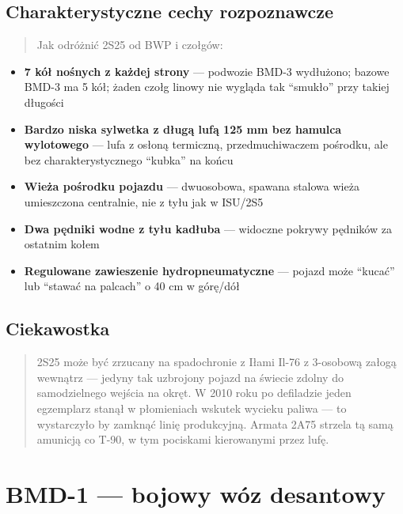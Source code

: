 \documentclass[12pt,oneside]{book}
\providecommand{\tightlist}{%
  \setlength{\itemsep}{0pt}\setlength{\parskip}{0pt}}
\begin{document}
\subsection{Charakterystyczne cechy
rozpoznawcze}\label{charakterystyczne-cechy-rozpoznawcze-6}

\begin{quote}
Jak odróżnić 2S25 od BWP i czołgów:
\end{quote}

\begin{itemize}
\tightlist
\item
  \textbf{7 kół nośnych z każdej strony} --- podwozie BMD-3 wydłużono;
  bazowe BMD-3 ma 5 kół; żaden czołg linowy nie wygląda tak ``smukło''
  przy takiej długości
\item
  \textbf{Bardzo niska sylwetka z długą lufą 125 mm bez hamulca
  wylotowego} --- lufa z osłoną termiczną, przedmuchiwaczem pośrodku,
  ale bez charakterystycznego ``kubka'' na końcu
\item
  \textbf{Wieża pośrodku pojazdu} --- dwuosobowa, spawana stalowa wieża
  umieszczona centralnie, nie z tyłu jak w ISU/2S5
\item
  \textbf{Dwa pędniki wodne z tyłu kadłuba} --- widoczne pokrywy
  pędników za ostatnim kołem
\item
  \textbf{Regulowane zawieszenie hydropneumatyczne} --- pojazd może
  ``kucać'' lub ``stawać na palcach'' o 40 cm w górę/dół
\end{itemize}

\subsection{Ciekawostka}\label{ciekawostka-6}

\begin{quote}
2S25 może być zrzucany na spadochronie z Iłami Il-76 z 3-osobową załogą
wewnątrz --- jedyny tak uzbrojony pojazd na świecie zdolny do
samodzielnego wejścia na okręt. W 2010 roku po defiladzie jeden
egzemplarz stanął w płomieniach wskutek wycieku paliwa --- to
wystarczyło by zamknąć linię produkcyjną. Armata 2A75 strzela tą samą
amunicją co T-90, w tym pociskami kierowanymi przez lufę.
\end{quote}

\section{BMD-1 --- bojowy wóz
desantowy}\label{bmd-1-bojowy-wuxf3z-desantowy}
\end{document}
